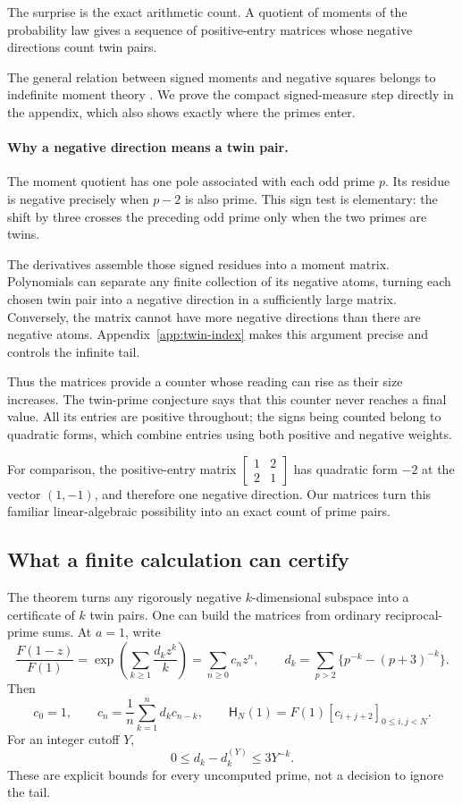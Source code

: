 The surprise is the exact arithmetic count. A quotient of moments
of the probability law gives a sequence of positive-entry matrices whose
negative directions count twin pairs.

The general relation between signed moments and negative squares belongs to
indefinite moment theory \cite{BergChristensenMaserick1988}. We prove the
compact signed-measure step directly in the appendix, which also shows
exactly where the primes enter.

\paragraph{Why a negative direction means a twin pair.}
The moment quotient has one pole associated with each odd prime $p$.
Its residue is negative precisely when $p-2$ is also prime. This sign
test is elementary: the shift by three crosses the preceding odd prime
only when the two primes are twins.

The derivatives assemble those signed residues into a moment matrix.
Polynomials can separate any finite collection of its negative atoms,
turning each chosen twin pair into a negative direction in a sufficiently
large matrix. Conversely, the matrix cannot have more negative directions
than there are negative atoms. Appendix~\ref{app:twin-index} makes this
argument precise and controls the infinite tail.

Thus the matrices provide a counter whose reading can rise as their size
increases. The twin-prime conjecture says that this counter never reaches
a final value. All its entries are positive throughout; the signs being
counted belong to quadratic forms, which combine entries using both
positive and negative weights.

For comparison, the positive-entry matrix
$\left[\begin{smallmatrix}1&2\\2&1\end{smallmatrix}\right]$
has quadratic form $-2$ at the vector $(1,-1)$, and therefore one
negative direction. Our matrices turn this familiar linear-algebraic
possibility into an exact count of prime pairs.

\subsection{What a finite calculation can certify}

The theorem turns any rigorously negative \(k\)-dimensional subspace into a
certificate of \(k\) twin pairs. One can build the matrices from ordinary
reciprocal-prime sums. At \(a=1\), write
\[
 \frac{F(1-z)}{F(1)}=\exp\left(\sum_{k\geq1}\frac{d_kz^k}{k}\right)
                    =\sum_{n\geq0}c_nz^n,\qquad
 d_k=\sum_{p>2}\{p^{-k}-(p+3)^{-k}\}.
\]
Then
\[
 c_0=1,\qquad c_n=\frac1n\sum_{k=1}^n d_kc_{n-k},\qquad
 \mathsf H_N(1)=F(1)[c_{i+j+2}]_{0\leq i,j<N}.
\]
For an integer cutoff \(Y\),
\[
       0\leq d_k-d_k^{(Y)}\leq3Y^{-k}.
\]
These are explicit bounds for every uncomputed prime, not a decision to
ignore the tail.

